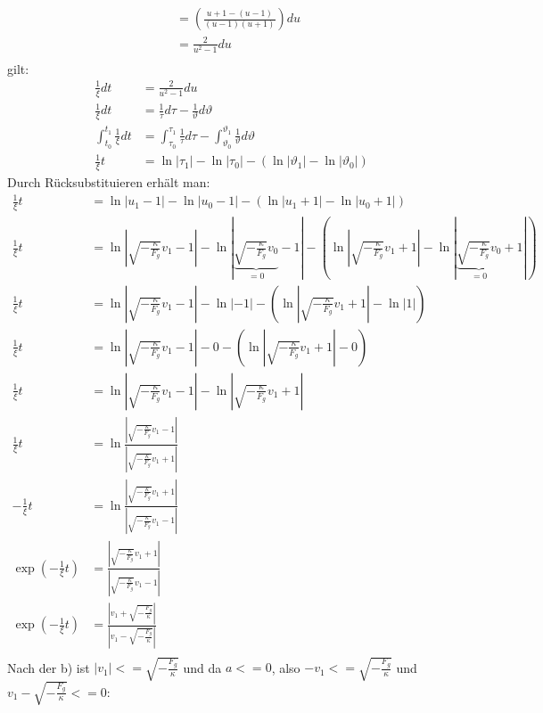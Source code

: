 \documentclass[sectionformat = aufgabe]{gadsescript}
\begin{document}
\begin{enumerate}[label=\alph*)]
\begin{align*}
			~&= \left(\frac{u + 1  - (u - 1)}{(u - 1) (u + 1)}\right)du\\
			~&= \frac{2}{u^2 - 1}du\\
		\end{align*}
		gilt:
		\begin{align*}
			\frac{1}{\xi}dt &= \frac{2}{u^2 - 1} du\\
			\frac{1}{\xi}dt &= \frac{1}{\tau} d\tau - \frac{1}{\vartheta}d\vartheta\\
			\int_{t_0}^{t_1} \frac{1}{\xi}dt &= \int_{\tau_0}^{\tau_1} \frac{1}{\tau} d\tau - \int_{\vartheta_0}^{\vartheta_1} \frac{1}{\vartheta}d\vartheta\\
			\frac{1}{\xi} t &= \ln |\tau_1| - \ln |\tau_0| - \left( \ln |\vartheta_1| - \ln |\vartheta_0| \right)
		\end{align*}
		Durch Rücksubstituieren erhält man:
		\begin{align*}
			\frac{1}{\xi} t &= \ln |u_1 - 1| - \ln |u_0 - 1| - \left( \ln |u_1 + 1| - \ln |u_0 + 1| \right)\\
			\frac{1}{\xi} t &= \ln |\sqrt{-\frac{\kappa}{F_g}} v_1 - 1| - \ln |\underbrace{\sqrt{-\frac{\kappa}{F_g}} v_0}_{=0} - 1| - \left( \ln |\sqrt{-\frac{\kappa}{F_g}} v_1 + 1| - \ln |\underbrace{\sqrt{-\frac{\kappa}{F_g}} v_0}_{=0} + 1| \right)\\
			\frac{1}{\xi} t &= \ln |\sqrt{-\frac{\kappa}{F_g}} v_1 - 1| - \ln |-1| - \left( \ln |\sqrt{-\frac{\kappa}{F_g}} v_1 + 1| - \ln |1| \right)\\
			\frac{1}{\xi} t &= \ln |\sqrt{-\frac{\kappa}{F_g}} v_1 - 1| - 0 - \left( \ln |\sqrt{-\frac{\kappa}{F_g}} v_1 + 1| - 0 \right)\\
			\frac{1}{\xi} t &= \ln |\sqrt{-\frac{\kappa}{F_g}} v_1 - 1|  - \ln |\sqrt{-\frac{\kappa}{F_g}} v_1 + 1|\\
			\frac{1}{\xi} t &= \ln \frac{|\sqrt{-\frac{\kappa}{F_g}} v_1 - 1|}{|\sqrt{-\frac{\kappa}{F_g}} v_1 + 1|}\\
			- \frac{1}{\xi} t &= \ln \frac{|\sqrt{-\frac{\kappa}{F_g}} v_1 + 1|}{|\sqrt{-\frac{\kappa}{F_g}} v_1 - 1|}\\
			\exp(- \frac{1}{\xi} t) &= \frac{|\sqrt{-\frac{\kappa}{F_g}} v_1 + 1|}{|\sqrt{-\frac{\kappa}{F_g}} v_1 - 1|}\\
			\exp(- \frac{1}{\xi} t) &= \frac{| v_1 + \sqrt{-\frac{F_g}{\kappa}}|}{| v_1 - \sqrt{-\frac{F_g}{\kappa}}|}\\
		\end{align*}
		Nach der b) ist $ |v_1| <= \sqrt{-\frac{F_g}{\kappa}} $ und da $a <= 0 $, also $ -v_1 <= \sqrt{ - \frac{F_g}{\kappa}} $ und $ v_1 - \sqrt{ - \frac{F_g}{\kappa}} <= 0 $:

\end{enumerate}
\end{document}
